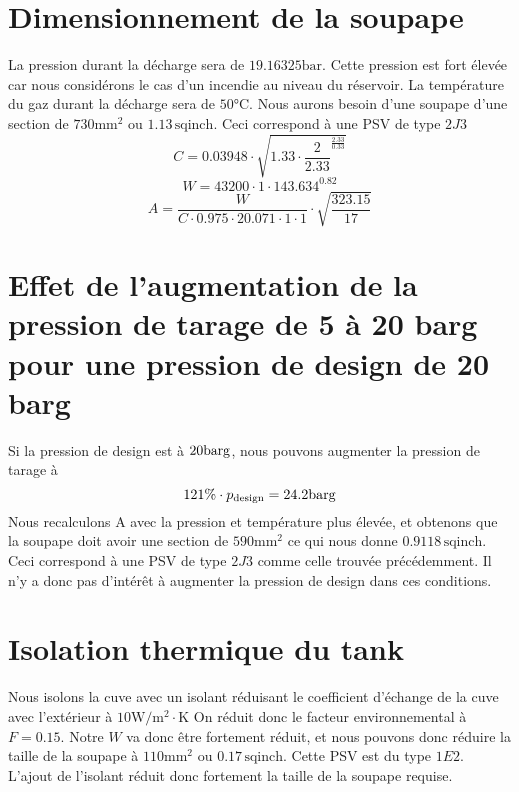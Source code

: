 \section{Dimensionnement de la soupape} 
La pression durant la décharge sera de $19.16325 \si{\bar}$. 
Cette pression est fort élevée car nous considérons le cas d'un incendie au niveau du réservoir. 
La température du gaz durant la décharge sera de $50\si{\celsius}$. 
Nous aurons besoin d'une soupape d'une section de $730\si{\milli\meter\squared}$ 
ou $1.13 \, \text{sqinch}$. Ceci correspond à une PSV de type $2J3$
\[ C = 0.03948 \cdot \sqrt{1.33 \cdot \frac{2}{2.33}^{\frac{2.33}{0.33}}} \]
\[ W = 43200 \cdot 1 \cdot 143.634^{0.82} \]
\[ A = \frac{W}{C \cdot 0.975 \cdot 20.071 \cdot 1 \cdot 1} \cdot \sqrt{\frac{323.15}{17}} \]

\section{Effet de l'augmentation de la pression de tarage de 5 à 20 barg pour une pression de design de 20 barg} 
Si la pression de design est à $20\si{\bar}\text{g}$, nous pouvons augmenter la pression de tarage à \[ 121\% \cdot p_{\text{design}} = 24.2\si{\bar}\text{g} \]
Nous recalculons A avec la pression et température plus élevée, et obtenons que la soupape doit avoir une section de $590\si{\milli\meter\squared}$
ce qui nous donne $0.9118 \, \text{sqinch}$. Ceci correspond à une PSV de type $2J3$ comme celle trouvée précédemment. Il n'y a donc pas d'intérêt
à augmenter la pression de design dans ces conditions.

\section{Isolation thermique du tank}
Nous isolons la cuve avec un isolant réduisant le coefficient d'échange de la cuve avec l'extérieur à 
$10 \si{\watt}/\si{\meter\squared} \cdot \si{\kelvin}$
On réduit donc le facteur environnemental à $F = 0.15$. 
Notre $W$ va donc être fortement réduit, et nous pouvons donc réduire la taille de la soupape à 
$110\si{\milli\meter\squared}$ ou $0.17 \, \text{sqinch}$. Cette PSV est du type $1E2$. L'ajout de l'isolant réduit donc fortement la taille de
la soupape requise.

